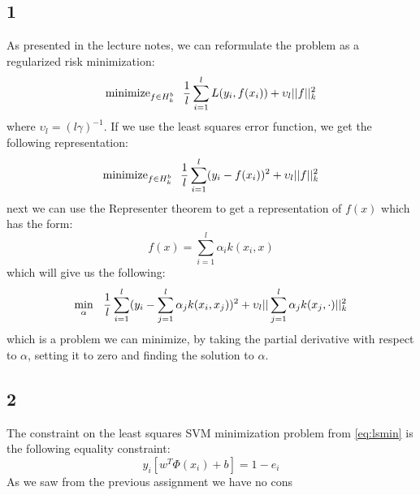 \documentclass{article}
\begin{document}
\subsection{1}
As presented in the lecture notes, we can reformulate the problem as a regularized risk minimization:
\begin{equation}
\text{minimize}_{f\in H^b_k} \hspace{0.25cm} \dfrac{1}{l} \sum\limits_{i=1}^l L(y_i,f(x_i)) + \upsilon_l ||f||^2_k
\end{equation}
where $\upsilon_l = (l\gamma)^{-1}$. If we use the least squares error function, we get the following representation:
\begin{equation}
\text{minimize}_{f\in H^b_k} \hspace{0.25cm} \dfrac{1}{l} \sum\limits_{i=1}^l (y_i - f(x_i))^2 + \upsilon_l ||f||^2_k
\end{equation}
next we can use the Representer theorem to get a representation of $f(x)$ which has the form:
\begin{equation}
f(x) = \sum\limits_{i=1}^l \alpha_i k(x_i,x)
\end{equation}
which will give us the following:
\begin{equation}
\min_{\alpha} \hspace{0.25cm} \dfrac{1}{l} \sum\limits_{i=1}^l (y_i - \sum\limits_{j=1}^l \alpha_j k(x_i, x_j))^2 + \upsilon_l || \sum\limits_{j=1}^l \alpha_j k(x_j,\cdot)||^2_k
\end{equation}
which is a problem we can minimize, by taking the partial derivative with respect to $\alpha$, setting it to zero and finding the solution to $\alpha$.
\subsection{2}
The constraint on the least squares SVM minimization problem from \eqref{eq:lsmin} is the following equality constraint:
\begin{equation}
y_i [w^T \Phi(x_i) +b] = 1 - e_i
\end{equation}
As we saw from the previous assignment we have no cons
\end{document}
